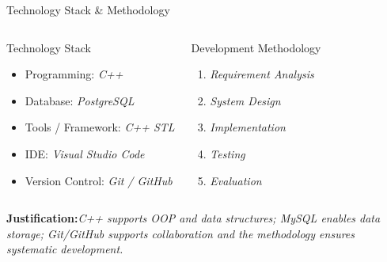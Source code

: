 \documentclass[aspectratio=169,11pt]{beamer}
\newcommand{\placeholder}[1]{\textit{\color{GEUGrey}#1}}
\begin{document}
\begin{frame}{Technology Stack \& Methodology}
\begin{columns}[T,totalwidth=\textwidth]
\begin{block}{Technology Stack}
\begin{itemize}\itemsep2pt
\item Programming: \placeholder{C++}
\item Database: \placeholder{PostgreSQL}
\item Tools / Framework: \placeholder{C++ STL}
\item IDE: \placeholder{Visual Studio Code}
\item Version Control: \placeholder{Git / GitHub}
\end{itemize}
\end{block}
\begin{block}{Development Methodology}
\begin{enumerate}\itemsep2pt
\item\placeholder{Requirement Analysis} 
\item\placeholder{System Design}
\item\placeholder{Implementation} 
\item\placeholder{Testing} 
\item\placeholder{Evaluation} 
\end{enumerate}
\end{block}
\end{columns}
\vfill
\begin{center}
    \scriptsize
    \textbf{\color{GEUBlue}Justification:}\placeholder{C++ supports OOP and data structures; MySQL enables data storage; 
    Git/GitHub supports collaboration and the methodology ensures systematic development.}
\end{center}
\end{frame}
\end{document}
